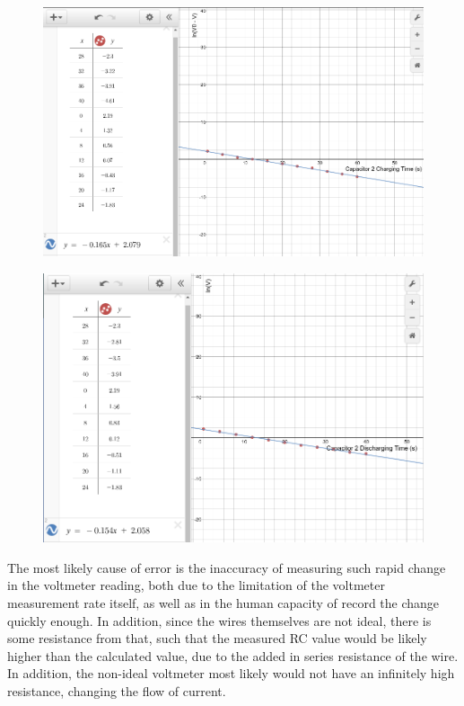 \documentclass[11pt, titlepage]{article}
\begin{document}
\begin{figure}[h]
\centering
\hspace*{0cm}
\includegraphics[scale=0.45]{graph33.jpg}
\vspace*{0cm}
\end{figure}

\begin{figure}[h]
\centering
\hspace*{0cm}
\includegraphics[scale=0.5]{graph34.jpg}
\vspace*{0cm}
\end{figure}

The most likely cause of error is the inaccuracy of measuring such rapid change in the voltmeter reading, both due to the limitation of the voltmeter measurement rate itself, as well as in the human capacity of record the change quickly enough. In addition, since the wires themselves are not ideal, there is some resistance from that, such that the measured RC value would be likely higher than the calculated value, due to the added in series resistance of the wire. In addition, the non-ideal voltmeter most likely would not have an infinitely high resistance, changing the flow of current.
\end{document}
